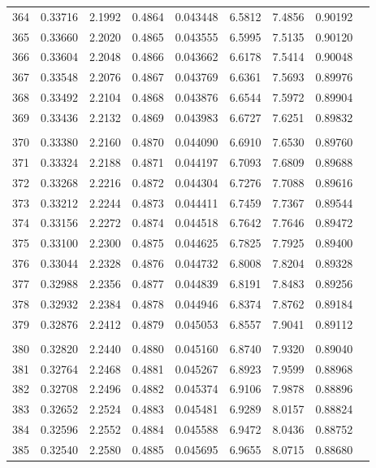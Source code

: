 \documentclass[letter,twosides,10pt]{article}
\begin{document}
\begin{longtable}{|c|c|c|c|c|c|c|c|c|}
364 & 0.33716 & 2.1992 & 0.4864 & 0.043448 & 6.5812 &  7.4856 & 0.90192 \\
365 & 0.33660 & 2.2020 & 0.4865 & 0.043555 & 6.5995 &  7.5135 & 0.90120 \\
366 & 0.33604 & 2.2048 & 0.4866 & 0.043662 & 6.6178 &  7.5414 & 0.90048 \\
367 & 0.33548 & 2.2076 & 0.4867 & 0.043769 & 6.6361 &  7.5693 & 0.89976 \\
368 & 0.33492 & 2.2104 & 0.4868 & 0.043876 & 6.6544 &  7.5972 & 0.89904 \\
369 & 0.33436 & 2.2132 & 0.4869 & 0.043983 & 6.6727 &  7.6251 & 0.89832 \\
 & & & & & & & \\
370 & 0.33380 & 2.2160 & 0.4870 & 0.044090 & 6.6910 &  7.6530 & 0.89760 \\
371 & 0.33324 & 2.2188 & 0.4871 & 0.044197 & 6.7093 &  7.6809 & 0.89688 \\
372 & 0.33268 & 2.2216 & 0.4872 & 0.044304 & 6.7276 &  7.7088 & 0.89616 \\
373 & 0.33212 & 2.2244 & 0.4873 & 0.044411 & 6.7459 &  7.7367 & 0.89544 \\
374 & 0.33156 & 2.2272 & 0.4874 & 0.044518 & 6.7642 &  7.7646 & 0.89472 \\
375 & 0.33100 & 2.2300 & 0.4875 & 0.044625 & 6.7825 &  7.7925 & 0.89400 \\
376 & 0.33044 & 2.2328 & 0.4876 & 0.044732 & 6.8008 &  7.8204 & 0.89328 \\
377 & 0.32988 & 2.2356 & 0.4877 & 0.044839 & 6.8191 &  7.8483 & 0.89256 \\
378 & 0.32932 & 2.2384 & 0.4878 & 0.044946 & 6.8374 &  7.8762 & 0.89184 \\
379 & 0.32876 & 2.2412 & 0.4879 & 0.045053 & 6.8557 &  7.9041 & 0.89112 \\
 & & & & & & & \\
380 & 0.32820 & 2.2440 & 0.4880 & 0.045160 & 6.8740 &  7.9320 & 0.89040 \\
381 & 0.32764 & 2.2468 & 0.4881 & 0.045267 & 6.8923 &  7.9599 & 0.88968 \\
382 & 0.32708 & 2.2496 & 0.4882 & 0.045374 & 6.9106 &  7.9878 & 0.88896 \\
383 & 0.32652 & 2.2524 & 0.4883 & 0.045481 & 6.9289 &  8.0157 & 0.88824 \\
384 & 0.32596 & 2.2552 & 0.4884 & 0.045588 & 6.9472 &  8.0436 & 0.88752 \\
385 & 0.32540 & 2.2580 & 0.4885 & 0.045695 & 6.9655 &  8.0715 & 0.88680 \\

\end{longtable}
\end{document}
